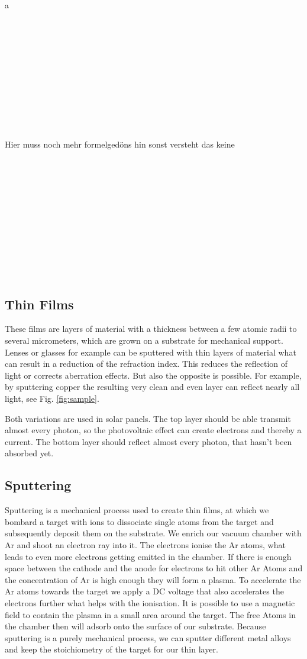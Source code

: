 \documentclass[]{article}
\begin{document}
a
\\\\\\\\\\\\\\\\\\\\\\\\Hier muss noch mehr formelgedöns hin sonst versteht das keine
\\\\\\\\\\\\\\\\\\\\\\\\


\subsection{Thin Films}
These films are layers of material with a thickness between a few atomic radii to several micrometers, which are grown on a substrate for mechanical support. Lenses or glasses for example can be sputtered with thin layers of material what can result in a reduction of the refraction index. This reduces the reflection of light or corrects aberration effects. But also the opposite is possible. For example, by sputtering copper the resulting very clean and even layer can reflect nearly all light, see Fig. \ref{fig:sample}. 

Both variations are used in solar panels. The top layer should be able transmit almost every photon, so the photovoltaic effect can create electrons and thereby a current. The bottom layer should reflect almost every photon, that hasn't been absorbed yet.

\subsection{Sputtering}
Sputtering is a mechanical process used to create thin films, at which we bombard a target with ions to dissociate single atoms from the target and subsequently deposit them on the substrate. We enrich our vacuum chamber with Ar and shoot an electron ray into it. The electrons ionise the Ar atoms, what leads to even more electrons getting emitted in the chamber. If there is enough space between the cathode and the anode for electrons to hit other Ar Atoms and the concentration of Ar is high enough they will form a plasma. To accelerate the Ar atoms towards the target we apply a DC voltage that also accelerates the electrons further what helps with the ionisation. It is possible to use a magnetic field to contain the plasma in a small area around the target. The free Atoms in the chamber then will adsorb onto the surface of our substrate. Because sputtering is a purely mechanical process, we can sputter different metal alloys and keep the stoichiometry of the target for our thin layer.
\end{document}
